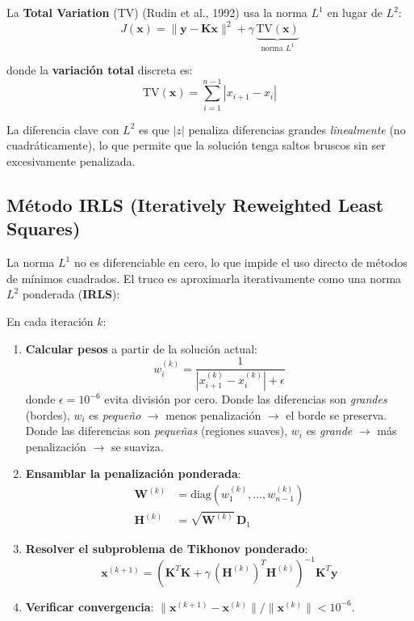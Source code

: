 \documentclass[a4paper,11pt]{article}
\begin{document}
La \textbf{Total Variation} (TV) (Rudin et al., 1992) usa la norma $L^1$ en
lugar de $L^2$:
\begin{equation}
    J(\mathbf{x}) = \|\mathbf{y} - \mathbf{K}\mathbf{x}\|^2
    + \gamma\,\underbrace{\text{TV}(\mathbf{x})}_{\text{norma } L^1}
\end{equation}

donde la \textbf{variaci\'on total} discreta es:
\begin{equation}
    \text{TV}(\mathbf{x}) = \sum_{i=1}^{n-1}|x_{i+1} - x_i|
\end{equation}

La diferencia clave con $L^2$ es que $|z|$ penaliza diferencias grandes
\emph{linealmente} (no cuadr\'aticamente), lo que permite que la soluci\'on
tenga saltos bruscos sin ser excesivamente penalizada.

\subsection{M\'etodo IRLS (Iteratively Reweighted Least Squares)}

La norma $L^1$ no es diferenciable en cero, lo que impide el uso directo de
m\'etodos de m\'inimos cuadrados.  El truco es aproximarla iterativamente
como una norma $L^2$ ponderada (\textbf{IRLS}):

En cada iteraci\'on $k$:
\begin{enumerate}
    \item \textbf{Calcular pesos} a partir de la soluci\'on actual:
    \begin{equation}
        w_i^{(k)} = \frac{1}{|x_{i+1}^{(k)} - x_i^{(k)}| + \epsilon}
    \end{equation}
    donde $\epsilon = 10^{-6}$ evita divisi\'on por cero.  Donde las
    diferencias son \emph{grandes} (bordes), $w_i$ es \emph{peque\~no}
    $\to$ menos penalizaci\'on $\to$ el borde se preserva.  Donde las
    diferencias son \emph{peque\~nas} (regiones suaves), $w_i$ es
    \emph{grande} $\to$ m\'as penalizaci\'on $\to$ se suaviza.

    \item \textbf{Ensamblar la penalizaci\'on ponderada}:
    \begin{align}
        \mathbf{W}^{(k)} &= \text{diag}(w_1^{(k)},\ldots,w_{n-1}^{(k)})\\
        \mathbf{H}^{(k)} &= \sqrt{\mathbf{W}^{(k)}}\,\mathbf{D}_1
    \end{align}

    \item \textbf{Resolver el subproblema de Tikhonov ponderado}:
    \begin{equation}
        \mathbf{x}^{(k+1)} = (\mathbf{K}^T\mathbf{K}
        + \gamma\,(\mathbf{H}^{(k)})^T\mathbf{H}^{(k)})^{-1}\mathbf{K}^T\mathbf{y}
    \end{equation}

    \item \textbf{Verificar convergencia}:
    $\|\mathbf{x}^{(k+1)} - \mathbf{x}^{(k)}\| / \|\mathbf{x}^{(k)}\| < 10^{-6}$.
\end{enumerate}
\end{document}
